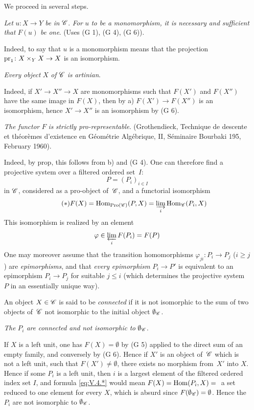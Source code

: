 We proceed in several steps.
\begin{enumerateb}
\item[a)] \emph{Let} $u \colon X \to Y$ \emph{be in}
$\cal{C}$. \emph{For} $u$ \emph{to be a monomorphism, it is necessary and
sufficient that} $F(u)$ \emph{be one}. (Uses (G 1), (G 4), (G 6)).

Indeed, to say that $u$ is a monomorphism means that the projection
$\pr_1 \colon X \times_Y X \to X$ is an isomorphism.

\item[b)] \emph{Every object} $X$ \emph{of} $\cal{C}$ \emph{is
artinian}.

Indeed, if $X' \to X'' \to X$ are monomorphisms such that
$F(X')$ and $F(X'')$ have the same image in $F(X)$, then by a)
$F(X') \to F(X'')$ is an isomorphism, hence $X' \to X''$ is an
isomorphism by (G 6).

\item[c)] \emph{The functor} $F$ \emph{is strictly
pro-representable}. (\cf Grothendieck, Technique de descente et
th\'eor\`emes d'existence en G\'eom\'etrie Alg\'ebrique, II,
S\'eminaire Bourbaki 195, February 1960).

Indeed, by \loccit prop\ptbl {}, this follows from
b) and (G 4). One can therefore find a projective system over a
filtered ordered set~$I$:
$$
P=(P_i)_{i \in I}
$$
in $\cal{C}$, considered as a pro-object of~$\cal{C}$, and a
functorial isomorphism
\begin{equation*}
\label{eq:V.4.*} \tag{$*$} F(X)=\Hom_{\Pro(\cal{C})}(P,X)=\varinjlim_{i} \Hom_{\cal{C}}(P_i,X)
\end{equation*}
This isomorphism is realized by an element
$$
\varphi \in \varprojlim_{i} F(P_i)=F(P)
$$
One may moreover assume that the transition homomorphisms
$\varphi_{ji} \colon P_i \to P_j$ ($i \geq j$) are
\emph{epimorphisms}, and that \emph{every epimorphism} $P_i \to
P'$ is equivalent to an epimorphism $P_i \to P_j$ for
suitable $j \leq i$ (which determines the projective system~$P$ in an essentially unique way).

An object $X \in \cal{C}$ is said to be \emph{connected}
if it is not isomorphic to the sum of two objects of~$\cal{C}$
not isomorphic to the initial object $\emptyset_{\cal{C}}$.

\item[d)] \emph{The} $P_i$ \emph{are connected and not isomorphic
to} $\emptyset_{\cal{C}}$.

If $X$ is a left unit, one has $F(X)=\emptyset$ by (G 5)
applied to the direct sum of an empty family, and
conversely by (G 6). Hence if $X'$ is an object of~$\cal{C}$
which is not a left unit, \ie such that $F(X') \neq
\emptyset$, there exists no morphism from~$X'$ into $X$. Hence if some
$P_i$ is a left unit, then $i$ is a largest
element of the filtered ordered index set $I$, and
formula \eqref{eq:V.4.*} would mean $F(X)=\operatorname{Hom}(P_i,X)={}$\kern2pt a set
reduced to one element for every $X$, which is absurd
since $F(\emptyset_{\cal{C}})=\emptyset$. Hence the~$P_i$ are not
isomorphic to $\emptyset_{\cal{C}}$.


\end{enumerateb}
